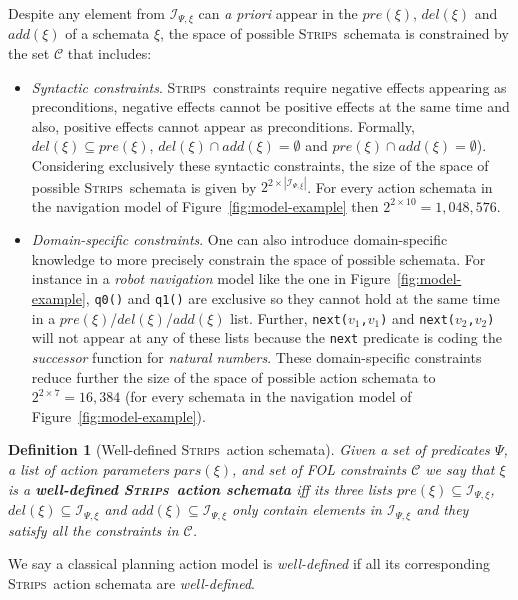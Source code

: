 \documentclass[letterpaper]{article} %
\newcommand{\strips}{\textsc{Strips}}     %
\newtheorem{definition}[theorem]{Definition}
\begin{document}
Despite any element from ${\mathcal I}_{\Psi,\xi}$ can {\em a priori} appear in the $pre(\xi)$, $del(\xi)$ and $add(\xi)$ of a schemata $\xi$, the space of possible \strips\ schemata is constrained by the set ${\mathcal C}$ that includes: 
\begin{itemize}
\item {\em Syntactic constraints}. \strips\ constraints require negative effects appearing as preconditions, negative effects cannot be positive effects at the same time and also, positive effects cannot appear as preconditions. Formally, $del(\xi)\subseteq pre(\xi)$, $del(\xi)\cap add(\xi)=\emptyset$ and $pre(\xi)\cap add(\xi)=\emptyset$). Considering exclusively these syntactic constraints, the size of the space of possible \strips\ schemata is given by $2^{2\times|{\mathcal I}_{\Psi,\xi}|}$. For every action schemata in the navigation model of Figure~\ref{fig:model-example} then $2^{2\times 10}=1,048,576$.
\item {\em Domain-specific constraints}. One can also introduce domain-specific knowledge to more precisely constrain the space of possible schemata. For instance in a {\em robot navigation} model like the one in Figure~\ref{fig:model-example}, {\small\tt q0()} and {\small\tt q1()} are exclusive so they cannot hold at the same time in a $pre(\xi)$/$del(\xi)$/$add(\xi)$ list. Further, {\small\tt next($v_1$,$v_1$)} and {\small\tt next($v_2$,$v_2$)} will not appear at any of these lists because the {\tt\small next} predicate is coding the {\em successor} function for {\em natural numbers}. These domain-specific constraints reduce further the size of the space of possible action schemata to $2^{2\times 7}=16,384$ (for every schemata in the navigation model of Figure~\ref{fig:model-example}).
\end{itemize}

\begin{definition}[Well-defined \strips\ action schemata]
Given a set of {\em predicates} $\Psi$, a list of action {\em parameters} $pars(\xi)$, and set of FOL constraints ${\mathcal C}$ we say that $\xi$ is a {\bf well-defined \strips\ action schemata} iff its three lists $pre(\xi)\subseteq {\mathcal I}_{\Psi,\xi}$, $del(\xi)\subseteq{\mathcal I}_{\Psi,\xi}$ and $add(\xi)\subseteq{\mathcal I}_{\Psi,\xi}$ only contain elements in ${\mathcal I}_{\Psi,\xi}$ and they satisfy all the constraints in ${\mathcal C}$. 
\end{definition}
We say a classical planning action model is {\em well-defined} if all its corresponding  \strips\ action schemata are {\em well-defined}.
\end{document}
